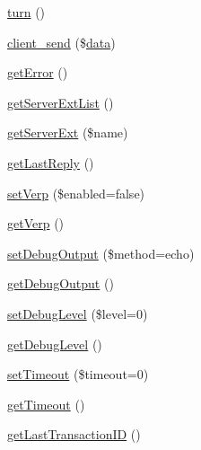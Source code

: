 \begin{DoxyCompactItemize}
\item 
\mbox{\hyperlink{class_s_m_t_p_a23432be779cb9f81f0d87b71533d18da}{turn}} ()
\item 
\mbox{\hyperlink{class_s_m_t_p_a766aff65780ee6afe43c18e4c4f07a72}{client\+\_\+send}} (\$\mbox{\hyperlink{class_s_m_t_p_ae5ae69f15530c34b0d40db955a83679c}{data}})
\item 
\mbox{\hyperlink{class_s_m_t_p_ae69932e8666ab3e15c22ea4d9f03909f}{get\+Error}} ()
\item 
\mbox{\hyperlink{class_s_m_t_p_a2d392b500c5aa5abc020d15215fd38e7}{get\+Server\+Ext\+List}} ()
\item 
\mbox{\hyperlink{class_s_m_t_p_ac2b1d73e9fde787c2be1ede45aba7ace}{get\+Server\+Ext}} (\$name)
\item 
\mbox{\hyperlink{class_s_m_t_p_a13044af4796d17fb77b5787c113aab55}{get\+Last\+Reply}} ()
\item 
\mbox{\hyperlink{class_s_m_t_p_a8c80ad0d0e5c35fc48220ec09ea05c89}{set\+Verp}} (\$enabled=false)
\item 
\mbox{\hyperlink{class_s_m_t_p_a3793e37459c62d9b9aecfd9259609cee}{get\+Verp}} ()
\item 
\mbox{\hyperlink{class_s_m_t_p_a02967d173ffe3360a21681063bf492ef}{set\+Debug\+Output}} (\$method=\textquotesingle{}echo\textquotesingle{})
\item 
\mbox{\hyperlink{class_s_m_t_p_aad1ba3fd91de65a4925981257f058c56}{get\+Debug\+Output}} ()
\item 
\mbox{\hyperlink{class_s_m_t_p_abc3c6e130e15cbaeee22fa4afc0f5551}{set\+Debug\+Level}} (\$level=0)
\item 
\mbox{\hyperlink{class_s_m_t_p_a6f20b9bdfa51d8f8c9f5dfa9a84de47e}{get\+Debug\+Level}} ()
\item 
\mbox{\hyperlink{class_s_m_t_p_aa56bc611cc6ee9c0d46a8b3ef31de79f}{set\+Timeout}} (\$timeout=0)
\item 
\mbox{\hyperlink{class_s_m_t_p_ae17f9c997dd105baa3301fcdcc66fc8a}{get\+Timeout}} ()
\item 
\mbox{\hyperlink{class_s_m_t_p_af9226bb26b40f9c999cfdb90f23c050c}{get\+Last\+Transaction\+ID}} ()
\end{DoxyCompactItemize}
